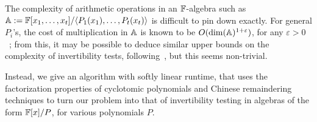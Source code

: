 The complexity of arithmetic operations in an $\mathbb{F}$-algebra such as
$\mathbb{A}:=\mathbb{F}[x_1,\dots,x_t]/\langle P_1(x_1),\dots,P_t(x_t)\rangle$ is
difficult to pin down exactly. For general $P_i$'s, the cost of
multiplication in $\mathbb{A}$ is known to be $O(\dim(\mathbb{A})^{1+\varepsilon})$, for
any $\varepsilon > 0$~\cite[Theorem~2]{LiMoSc09}; from this, it may be
possible to deduce similar upper bounds on the complexity of invertibility 
tests, following~\cite{DaMMMScXi06}, but this seems non-trivial.

Instead, we give an algorithm with softly linear runtime, that uses
the factorization properties of cyclotomic polynomials and Chinese
remaindering techniques to turn our problem into that of invertibility
testing in algebras of the form $\mathbb{F}[x]/P$, for various polynomials
$P$.

\smallskip

